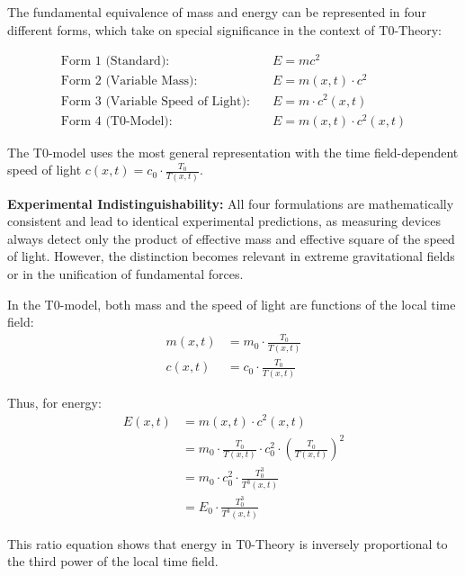 \documentclass[12pt,a4paper]{article}
\theoremstyle{definition}
\begin{document}
	The fundamental equivalence of mass and energy can be represented in four different forms, which take on special significance in the context of T0-Theory:
	
	\begin{align}
		\text{Form 1 (Standard):} \quad & E = mc^2 \tag{14}\\
		\text{Form 2 (Variable Mass):} \quad & E = m(x,t) \cdot c^2 \tag{15}\\
		\text{Form 3 (Variable Speed of Light):} \quad & E = m \cdot c^2(x,t) \tag{16}\\
		\text{Form 4 (T0-Model):} \quad & E = m(x,t) \cdot c^2(x,t) \tag{17}
	\end{align}
	
	The T0-model uses the most general representation with the time field-dependent speed of light $c(x,t) = c_0 \cdot \frac{T_0}{T(x,t)}$.
	
	\begin{wichtig}
		\textbf{Experimental Indistinguishability:} All four formulations are mathematically consistent and lead to identical experimental predictions, as measuring devices always detect only the product of effective mass and effective square of the speed of light. However, the distinction becomes relevant in extreme gravitational fields or in the unification of fundamental forces.
	\end{wichtig}
	
	\begin{verhaltnis}
		In the T0-model, both mass and the speed of light are functions of the local time field:
		\begin{align}
			m(x,t) &= m_0 \cdot \frac{T_0}{T(x,t)}\\
			c(x,t) &= c_0 \cdot \frac{T_0}{T(x,t)}
		\end{align}
		
		Thus, for energy:
		\begin{align}
			E(x,t) &= m(x,t) \cdot c^2(x,t)\\
			&= m_0 \cdot \frac{T_0}{T(x,t)} \cdot c_0^2 \cdot \left(\frac{T_0}{T(x,t)}\right)^2\\
			&= m_0 \cdot c_0^2 \cdot \frac{T_0^3}{T^3(x,t)}\\
			&= E_0 \cdot \frac{T_0^3}{T^3(x,t)}
		\end{align}
		
		This ratio equation shows that energy in T0-Theory is inversely proportional to the third power of the local time field.
	\end{verhaltnis}
	
\end{document}
